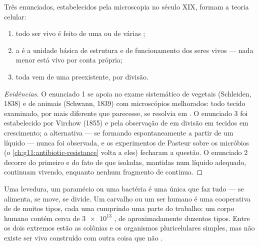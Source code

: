 \begin{proposition}\label{prop:g10:cells-common-unit:theory}
Três enunciados, estabelecidos pela microscopia no século XIX, formam a
teoria celular:
\begin{enumerate}
  \item todo ser vivo é feito de uma ou de várias ;
  \item a  é a unidade básica de estrutura e de funcionamento dos
        seres vivos --- nada menor está vivo por conta própria;
  \item toda  vem de uma  preexistente, por divisão.
\end{enumerate}
\end{proposition}
\begin{proof}[Evidências]
O enunciado 1 se apoia no exame sistemático de vegetais (Schleiden,
1838) e de animais (Schwann, 1839) com microscópios melhorados: todo
tecido examinado, por mais diferente que parecesse, se resolvia em
. O enunciado 3 foi estabelecido por Virchow (1855) e pela
observação de  em divisão em tecidos em crescimento; a
alternativa ---  se formando espontaneamente a partir de um
líquido --- nunca foi observada, e os experimentos de Pasteur sobre os
micróbios (o \cref{ch:g11:antibiotic-resistance} volta a eles) fecharam
a questão. O enunciado 2 decorre do primeiro e do fato de que 
isoladas, mantidas num líquido adequado, continuam vivendo, enquanto
nenhum fragmento de  continua.
\end{proof}

\begin{example}\label{ex:g10:cells-common-unit:onemany}
Uma levedura, um paramécio ou uma bactéria é uma única  que faz
tudo --- se alimenta, se move, se divide. Um carvalho ou um ser humano é
uma cooperativa de  de muitos tipos, cada uma cumprindo uma
parte do trabalho: um corpo humano contém cerca de $\num{3e13}$
, de aproximadamente duzentos tipos. Entre os dois extremos
estão as colônias e os organismos pluricelulares simples, mas não
existe ser vivo construído com outra coisa que não .
\end{example}

